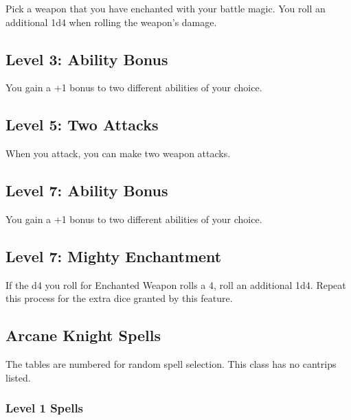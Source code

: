 \documentclass[12pt,letterpaper,twocolumn,openany,nodeprecatedcode,bg=none]{dndbook}
\let\oldsubsection\subsection
\renewcommand{\subsection}[1]{%
  \needspace{5\baselineskip}%
  \oldsubsection{#1}%
}
\begin{document}
Pick a weapon that you have enchanted with your battle magic. You roll
an additional 1d4 when rolling the weapon's damage.

\subsection{Level 3: Ability Bonus}\label{level-3-ability-bonus}

You gain a +1 bonus to two different abilities of your choice.

\subsection{Level 5: Two Attacks}\label{level-5-two-attacks}

When you attack, you can make two weapon attacks.

\subsection{Level 7: Ability Bonus}\label{level-7-ability-bonus}

You gain a +1 bonus to two different abilities of your choice.

\subsection{Level 7: Mighty
Enchantment}\label{level-7-mighty-enchantment}

If the d4 you roll for Enchanted Weapon rolls a 4, roll an additional
1d4. Repeat this process for the extra dice granted by this feature.

\subsection{Arcane Knight Spells}\label{arcane-knight-spells}

The tables are numbered for random spell selection. This class has no
cantrips listed.

\subsubsection{Level 1 Spells}\label{level-1-spells}

\end{document}
